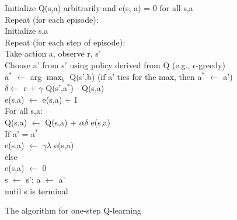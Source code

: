 \documentclass{article}
\newcommand{\tab}{\hspace{10mm}}
\newcommand{\dtab}{\hspace{20mm}}
\newcommand{\ttab}{\hspace{30mm}}
\newcommand{\qtab}{\hspace{40mm}}
\begin{document}
\begin{figure}[h!] 
\begin{algorithm}[H]
Initialize Q(s,a) arbitrarily and e(s, a) = 0 for all s,a \\
Repeat (for each episode):\\
\tab Initialize s,a\\
\tab Repeat (for each step of episode):\\
\dtab Take action a, observe r, s'\\
\dtab Choose a' from s' using policy derived from Q (e.g., $\epsilon$-greedy)\\
\dtab a$^*$ $\leftarrow$ arg $\max_b$ Q(s',b) (if a' ties for the max, then a$^*$ $\leftarrow$ a') \\
\dtab $\delta \leftarrow$ r + $\gamma$ Q(s',a$^*$) - Q(s,a)\\
\dtab e(s,a) $\leftarrow$ e(s,a) + 1\\
\dtab For all s,a:\\
\ttab Q(s,a) $\leftarrow$ Q(s,a) + $\alpha \delta$ e(s,a) \\
\ttab If a' = a$^*$ \\
\qtab e(s,a) $\leftarrow$ $\gamma \lambda$ e(s,a)\\
\ttab else \\
\qtab e(s,a) $\leftarrow$ 0\\
\dtab s $\leftarrow$ s'; a $\leftarrow$ a'\\
\tab until s is terminal\\
\end{algorithm}
\caption{The algorithm for one-step Q-learning\cite{bartosutton}}
\label{alg:qlearning}
\end{figure}
\end{document}
